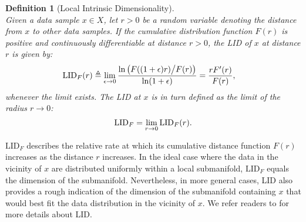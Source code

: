 \documentclass{article}
\newtheorem{definition}{Definition}
\begin{document}
\begin{definition}[Local Intrinsic Dimensionality] \quad \\
Given a data sample $x \in X$, let $r>0$ be a random variable denoting the distance from $x$ to other data samples. If the cumulative distribution function $F(r)$ is positive and continuously differentiable at distance $r>0$, the LID of $x$ at distance $r$ is given by:
\begin{equation} \label{eq:LID_r}
  \begin{split}
    \textup{LID}_F(r) & \triangleq \lim_{\epsilon\to 0} \frac{\ln\big(F((1+\epsilon) r)\big/F(r)\big)}{\ln(1+\epsilon)} 
     = \frac{r F'(r)}{F(r)},
  \end{split}
\end{equation}
whenever the limit exists.
\label{def:lid}
The \textup{LID} at $x$ is in turn defined as the limit of the radius $r \to 0$: 
\begin{equation} \label{eq:LID}
    \textup{LID}_F = \lim_{r \to 0}  \textup{LID}_F(r).
\end{equation}
\end{definition}
$\text{LID}_F$ describes the relative rate at which its cumulative distance function $F(r)$ increases as the distance $r$ increases. In the ideal case where the data in the vicinity of $x$ are distributed uniformly within a local submanifold, $\text{LID}_F$ equals the dimension of the submanifold. Nevertheless, in more general cases, LID also provides a rough indication of the dimension of the submanifold containing $x$ that would best fit the data distribution in the vicinity of $x$. 
 We refer readers to \cite{houle2017local1,houle2017local2} for more details about LID.

\end{document}
